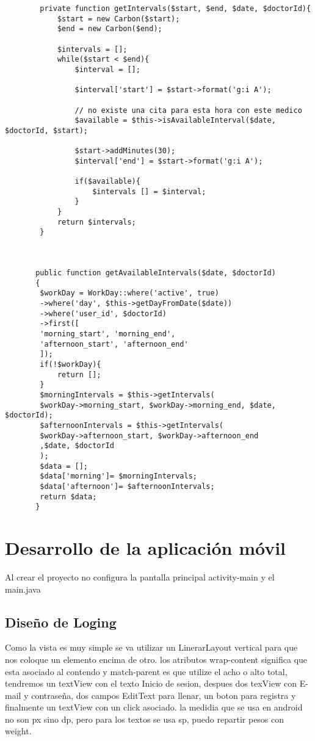 \documentclass[a4paper]{article}
\begin{document}
	\begin{lstlisting}
		private function getIntervals($start, $end, $date, $doctorId){
			$start = new Carbon($start);
			$end = new Carbon($end);
			
			$intervals = [];
			while($start < $end){
				$interval = [];
				
				$interval['start'] = $start->format('g:i A');
				
				// no existe una cita para esta hora con este medico
				$available = $this->isAvailableInterval($date, $doctorId, $start);
				
				$start->addMinutes(30);
				$interval['end'] = $start->format('g:i A');
				
				if($available){
					$intervals [] = $interval;
				}
			}
			return $intervals;
		}
	
	
	
	   public function getAvailableIntervals($date, $doctorId)
	   {
	   	$workDay = WorkDay::where('active', true)
	   	->where('day', $this->getDayFromDate($date))
	   	->where('user_id', $doctorId)
	   	->first([
	   	'morning_start', 'morning_end',
	   	'afternoon_start', 'afternoon_end'
	   	]);
	   	if(!$workDay){
	   		return [];
	   	}
	   	$morningIntervals = $this->getIntervals(
	   	$workDay->morning_start, $workDay->morning_end, $date, $doctorId);
	   	$afternoonIntervals = $this->getIntervals(
	   	$workDay->afternoon_start, $workDay->afternoon_end
	   	,$date, $doctorId
	   	);
	   	$data = [];
	   	$data['morning']= $morningIntervals;
	   	$data['afternoon']= $afternoonIntervals;
	   	return $data;
	   }
	\end{lstlisting}


	\newpage
	\section{Desarrollo de la aplicación móvil}
	\hfill \break
	
	Al crear el proyecto no configura la pantalla principal activity-main y el main.java
	
	\subsection{Diseño de Loging}
	\hfill \break
	
	Como la vista es muy simple se va utilizar un LinerarLayout vertical para que nos coloque un elemento encima de otro. los atributos wrap-content significa que esta asociado al contendo y match-parent es que utilize el acho o alto total, tendremos un textView con el texto Inicio de sesion, despues dos texView con E-mail y contraseña, dos campos EditText para llenar, un boton para registra y finalmente un textView con un click asociado. la medidia que se usa en android no son px sino dp, pero para los textos se usa sp, puedo repartir pesos con weight.
	
\end{document}

